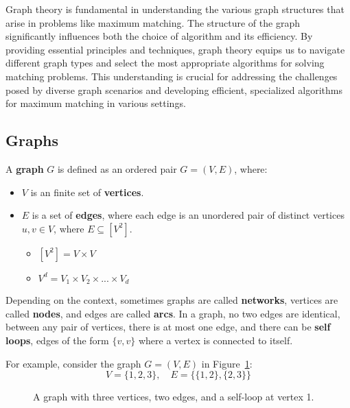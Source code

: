 
Graph theory is fundamental in understanding the various graph structures that arise in problems like maximum matching. The structure of the graph significantly influences both the choice of algorithm and its efficiency. By providing essential principles and techniques, graph theory equips us to navigate different graph types and select the most appropriate algorithms for solving matching problems. This understanding is crucial for addressing the challenges posed by diverse graph scenarios and developing efficient, specialized algorithms for maximum matching in various settings.

\subsection{Graphs}
A \textbf{graph} \( G \) is defined as an ordered pair \( G = (V, E) \), where:
\begin{itemize}
    \item \( V \) is an finite set of \textbf{vertices}.
    \item \( E \) is a set of \textbf{edges}, where each edge is an unordered pair of distinct vertices \( u, v \in V \), where \( E \subseteq [V^2]\).
    \begin{itemize}
        \item \([V^2] = V \times V\)
        \item \(V^d = V_1 \times V_2 \times ... \times V_d\)
    \end{itemize}
\end{itemize}
Depending on the context, sometimes graphs are called \textbf{networks}, vertices are called \textbf{nodes}, and edges are called \textbf{arcs}. In a graph, no two edges are identical, between any pair of vertices, there is at most one edge, and there can be \textbf{self loops}, edges of the form \( \{v, v\} \) where a vertex is connected to itself.

For example, consider the graph \( G = (V, E) \) in Figure~\ref{fig:general_graph}:
\[
V = \{1, 2, 3\}, \quad E = \{\{1, 2\}, \{2, 3\}\}
\]

\begin{figure}[h]
\begin{center}
\caption{A graph with three vertices, two edges, and a self-loop at vertex 1.}
\label{fig:general_graph}
\end{center}
\end{figure}

